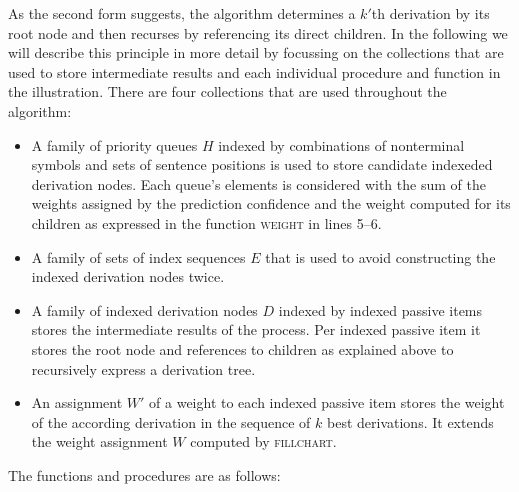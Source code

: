 \documentclass[../document.tex]{subfiles}
\begin{document}
    As the second form suggests, the algorithm determines a \(k'\)th derivation by its root node and then recurses by referencing its direct children.
    In the following we will describe this principle in more detail by focussing on the collections that are used to store intermediate results and each individual procedure and function in the illustration.
    There are four collections that are used throughout the algorithm:
    \begin{itemize}
        \item A family of priority queues \(H\) indexed by combinations of nonterminal symbols and sets of sentence positions is used to store candidate indexeded derivation nodes.
            Each queue's elements is considered with the sum of the weights assigned by the prediction confidence and the weight computed for its children as expressed in the function \textsc{weight} in lines 5--6.
        \item A family of sets of index sequences \(E\) that is used to avoid constructing the indexed derivation nodes twice.
        \item A family of indexed derivation nodes \(D\) indexed by indexed passive items stores the intermediate results of the process.
            Per indexed passive item it stores the root node and references to children as explained above to recursively express a derivation tree.
        \item An assignment \(W'\) of a weight to each indexed passive item stores the weight of the according derivation in the sequence of $k$ best derivations.
            It extends the weight assignment \(W\) computed by \textsc{fillchart}.
    \end{itemize}
    The functions and procedures are as follows:
\end{document}
